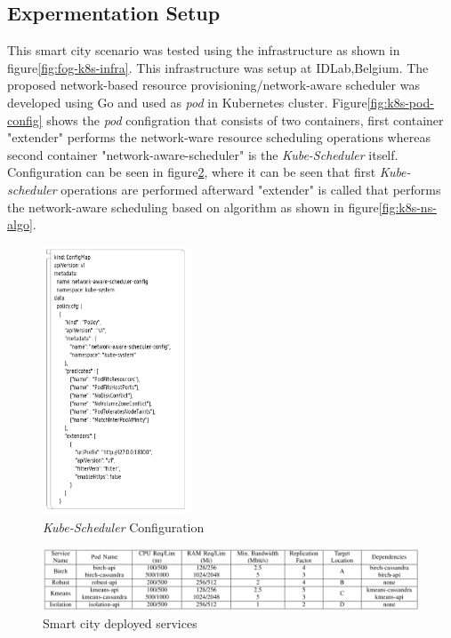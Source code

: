 \subsection{Expermentation Setup}
\label{sec:setup}
This smart city scenario was tested using the infrastructure as shown in figure\ref{fig:fog-k8s-infra}. This infrastructure was setup at IDLab,Belgium\cite{Santos2019}. The proposed network-based resource provisioning/network-aware scheduler was developed using Go and used as \emph{pod} in Kubernetes cluster\cite{Santos2019}. Figure\ref{fig:k8s-pod-config} shows the \emph{pod} configration that consists of two containers, first container "extender" performs the network-ware resource scheduling operations whereas second container "network-aware-scheduler" is the \emph{Kube-Scheduler} itself\cite{Santos2019}. Configuration can be seen in figure\ref{fig:k8s-sch-config}, where it can be seen that first \emph{Kube-scheduler} operations are performed afterward "extender" is called that performs the network-aware scheduling based on algorithm as shown in figure\ref{fig:k8s-ns-algo}. \par
\begin{figure}
  \centering
  \includegraphics[width=\linewidth, height=8cm]{figures/mlcn-k8s-scheduler-config.pdf}
  \caption{\emph{Kube-Scheduler} Configuration\cite{Santos2019}}
  \label{fig:k8s-sch-config}
\end{figure}
\begin{figure}
  \includegraphics[width=\linewidth]{figures/mlcn-k8s-service-pods.pdf}
  \caption{Smart city deployed services\cite{Santos2019}}
  \label{fig:k8s-sch-config}
\end{figure}
